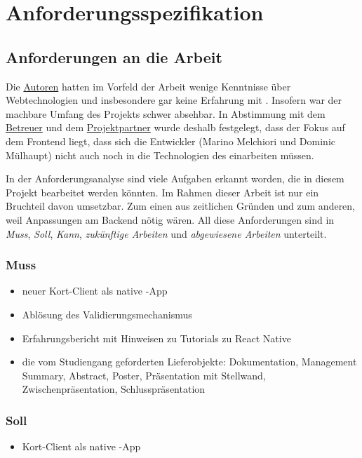 \chapter{Anforderungsspezifikation}
\label{pd-anforderungsspezifikation}

\section{Anforderungen an die Arbeit} 
Die \hyperref[pm-team-autoren]{Autoren} hatten im Vorfeld der Arbeit wenige Kenntnisse über Webtechnologien und insbesondere gar keine Erfahrung mit .
Insofern war der machbare Umfang des Projekts schwer absehbar.
In Abstimmung mit dem \hyperref[pm-team]{Betreuer} und dem \hyperref[pm-team]{Projektpartner} wurde deshalb festgelegt, dass der Fokus auf dem Frontend liegt, dass sich die Entwickler (Marino Melchiori und Dominic Mülhaupt) nicht auch noch in die Technologien des  einarbeiten müssen.

In der Anforderungsanalyse sind viele Aufgaben erkannt worden, die in diesem Projekt bearbeitet werden könnten. 
Im Rahmen dieser Arbeit ist nur ein Bruchteil davon umsetzbar.
Zum einen aus zeitlichen Gründen und zum anderen, weil Anpassungen am Backend nötig wären.
All diese Anforderungen sind in \emph{Muss}, \emph{Soll}, \emph{Kann}, \emph{zukünftige Arbeiten} und \emph{abgewiesene Arbeiten} unterteilt.

\subsection{Muss}
\begin{itemize}
	\item neuer Kort-Client als native -App
	\item Ablösung des Validierungsmechanismus
	\item Erfahrungsbericht mit Hinweisen zu Tutorials zu React Native
	\item die vom Studiengang geforderten Lieferobjekte: Dokumentation, Management Summary, Abstract, Poster, Präsentation mit Stellwand, Zwischenpräsentation, Schlusspräsentation
\end{itemize}

\subsection{Soll}
\begin{itemize}
	\item Kort-Client als native -App
\end{itemize}

